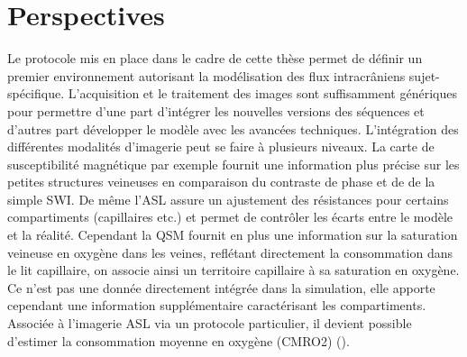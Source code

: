 
\chapter{Perspectives}
	\minitoc


Le protocole mis en place dans le cadre de cette thèse permet de définir un premier
environnement autorisant la modélisation des flux intracrâniens sujet-spécifique. L’acquisition et le
traitement des images sont suffisamment génériques pour permettre d’une part d’intégrer les
nouvelles versions des séquences et d’autres part développer le modèle avec les avancées techniques.
L’intégration des différentes modalités d’imagerie peut se faire à plusieurs niveaux. La carte de
susceptibilité magnétique par exemple fournit une information plus précise sur les petites structures
veineuses en comparaison du contraste de phase et de de la simple SWI. De même l’ASL assure un
ajustement des résistances pour certains compartiments (capillaires etc.) et permet de contrôler les
écarts entre le modèle et la réalité. Cependant la QSM fournit en plus une information sur la saturation
veineuse en oxygène dans les veines, reflétant directement la consommation dans le lit capillaire, on
associe ainsi un territoire capillaire à sa saturation en oxygène. Ce n’est pas une donnée directement
intégrée dans la simulation, elle apporte cependant une information supplémentaire caractérisant les
compartiments. Associée à l’imagerie ASL via un protocole particulier, il devient possible d’estimer la
consommation moyenne en oxygène (CMRO2) (\cite{Zhang2014}).

